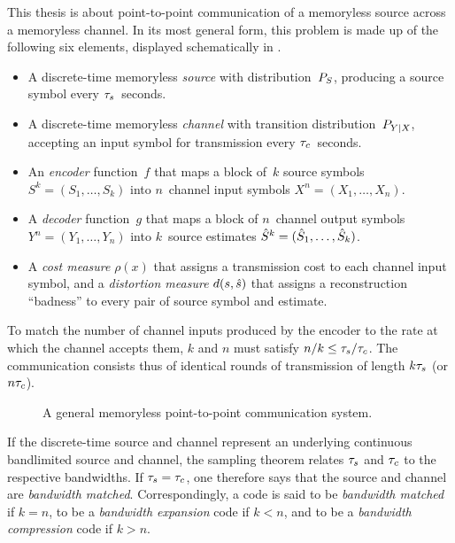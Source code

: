 This thesis is about point-to-point communication of a memoryless source across
a memoryless channel. In its most general form, this problem is made up of the
following six elements, displayed schematically in .
\begin{itemize}
  \item A discrete-time memoryless \emph{source} with distribution~${P_S}$,
    producing a source symbol every ${\tau_s}$~seconds.
  \item A discrete-time memoryless \emph{channel} with transition
    distribution~$P_{Y|X}$, accepting an input symbol for transmission every
    ${\tau_c}$~seconds.
  \item An \emph{encoder} function~$f$ that maps a block of~$k$ source symbols
    $S^k = (S_1, \dots, S_k)$ into $n$~channel input symbols $X^n = (X_1, \dots,
    X_n)$.
  \item A \emph{decoder} function~$g$ that maps a block of $n$~channel output
    symbols $Y^n = (Y_1, \dots, Y_n)$ into $k$~source estimates ${\hat{S}}^k = ({\hat{S}}_1,
    \dots, {\hat{S}}_k)$.
  \item A \emph{cost measure} $\rho(x)$ that assigns a transmission cost to each
    channel input symbol, and a \emph{distortion measure} $d(s,{\hat{s}})$ that
    assigns a reconstruction ``badness'' to every pair of source symbol and
    estimate.
\end{itemize}
To match the number of channel inputs produced by the encoder to the
rate at which the channel accepts them, $k$ and $n$ must satisfy $n/k \le {\tau_s} /
{\tau_c}$. The communication consists thus of identical rounds of transmission of
length $k{\tau_s}$ (or $n{\tau_c}$).



\begin{figure}
  \begin{center}
    
  \end{center}
  \caption{A general memoryless point-to-point communication system.}
  \label{fig:scgen}
\end{figure}

If the discrete-time source and channel represent an underlying continuous
bandlimited source and channel, the sampling theorem relates ${\tau_s}$ and ${\tau_c}$ to
the respective bandwidths. If ${\tau_s} = {\tau_c}$, one therefore says that the source
and channel are \emph{bandwidth matched}. Correspondingly, a code is said to be
\emph{bandwidth matched} if $k=n$, to be a \emph{bandwidth expansion} code if $k
< n$, and to be a \emph{bandwidth compression} code if $k > n$. 

